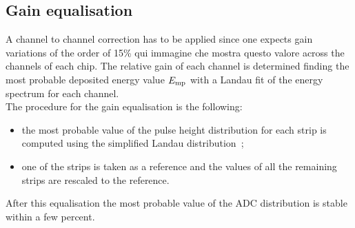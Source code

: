 %


\subsection{Gain equalisation}
A channel to channel correction has to be applied since one expects gain
variations of the order of 15\% {\color{red}  qui immagine che mostra questo valore} across the channels of each chip. The relative
gain of each channel is determined finding the most probable deposited energy
value $E_{\rm mp}$ with a Landau fit of the energy spectrum for
each channel.\\
The procedure for the gain equalisation is the following:
\begin{itemize}
\item the most probable value of the pulse height distribution for each strip is
  computed using the simplified Landau distribution~;
\item one of the strips is taken as a reference and the values of all the
  remaining strips are rescaled to the reference.
\end{itemize}
After this equalisation the most probable value of the ADC distribution is
stable within a few percent.


